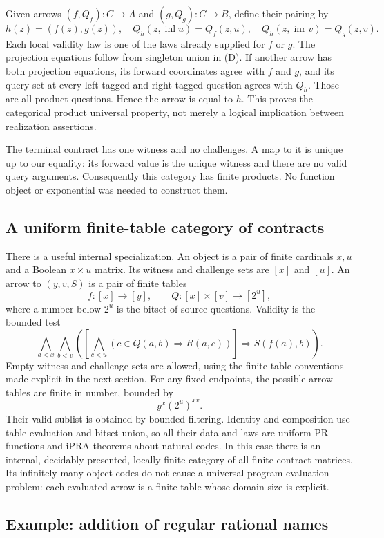 Given arrows $(f,Q_f):C\to A$ and $(g,Q_g):C\to B$, define their pairing by
\[
 h(z)=(f(z),g(z)),\quad
 Q_h(z,\operatorname{inl}u)=Q_f(z,u),\quad
 Q_h(z,\operatorname{inr}v)=Q_g(z,v).
\]
Each local validity law is one of the laws already supplied for $f$ or $g$.
The projection equations follow from singleton union in (D).  If another arrow
has both projection equations, its forward coordinates agree with $f$ and
$g$, and its query set at every left-tagged and right-tagged question agrees
with $Q_h$.  Those are all product questions.  Hence the arrow is equal to
$h$.  This proves the categorical product universal property, not merely a
logical implication between realization assertions.

The terminal contract has one witness and no challenges.  A map to it is
unique up to our equality: its forward value is the unique witness and there
are no valid query arguments.  Consequently this category has finite
products.  No function object or exponential was needed to construct them.

\subsection{A uniform finite-table category of contracts}

There is a useful internal specialization.  An object is a pair of finite
cardinals $x,u$ and a Boolean $x\times u$ matrix.  Its witness and challenge
sets are $[x]$ and $[u]$.  An arrow to $(y,v,S)$ is a pair of finite tables
\[
 f:[x]\to[y],\qquad Q:[x]\times[v]\to[2^u],
\]
where a number below $2^u$ is the bitset of source questions.  Validity is the
bounded test
\[
 \bigwedge_{a<x}\bigwedge_{b<v}
 \left(\left[\bigwedge_{c<u}
      (c\in Q(a,b)\Rightarrow R(a,c))\right]
      \Rightarrow S(f(a),b)\right).
\]
Empty witness and challenge sets are allowed, using the finite table
conventions made explicit in the next section. For any fixed endpoints, the possible arrow
tables are finite in number, bounded by
\[
 y^x(2^u)^{xv}.
\]
Their valid sublist is obtained by bounded filtering.  Identity and
composition use table evaluation and bitset union, so all their data and laws
are uniform PR functions and iPRA theorems about natural codes.  In this case
there is an internal, decidably presented, locally finite category of all
finite contract matrices.  Its infinitely many object codes do not cause a
universal-program-evaluation problem: each evaluated arrow is a finite table
whose domain size is explicit.

\subsection{Example: addition of regular rational names}

